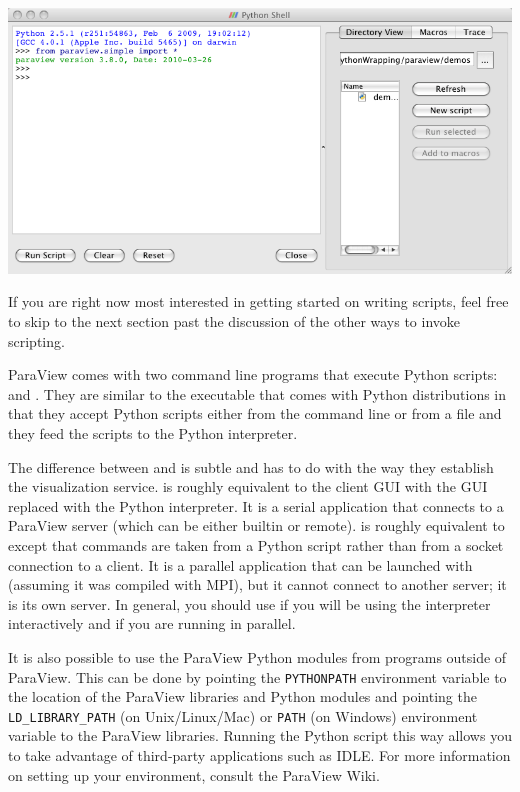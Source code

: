 \begin{inlinefig}
  \includegraphics[width=.9\linewidth]{images/PythonShellDialog}
\end{inlinefig}

If you are right now most interested in getting started on writing scripts,
feel free to skip to the next section past the discussion of the other ways
to invoke scripting.

ParaView comes with two command line programs that execute Python scripts:
 and .  They are similar to the
 executable that comes with Python distributions in
that they accept Python scripts either from the command line or from a file
and they feed the scripts to the Python interpreter.

The difference between  and  is
subtle and has to do with the way they establish the visualization
service.   is roughly equivalent to the
 client GUI with the GUI replaced with the Python
interpreter.  It is a serial application that connects to a ParaView server
(which can be either builtin or remote).   is roughly
equivalent to  except that commands are taken from a
Python script rather than from a socket connection to a client.  It is a
parallel application that can be launched with  (assuming
it was compiled with MPI), but it cannot connect to another server; it is
its own server.  In general, you should use  if you
will be using the interpreter interactively and  if
you are running in parallel.

It is also possible to use the ParaView Python modules from programs
outside of ParaView.  This can be done by pointing the \texttt{PYTHONPATH}
environment variable to the location of the ParaView libraries and Python
modules and pointing the \texttt{LD\_LIBRARY\_PATH} (on Unix/Linux/Mac) or
\texttt{PATH} (on Windows) environment variable to the ParaView libraries.
Running the Python script this way allows you to take advantage of
third-party applications such as IDLE.  For more information on setting up
your environment, consult the ParaView Wiki.

